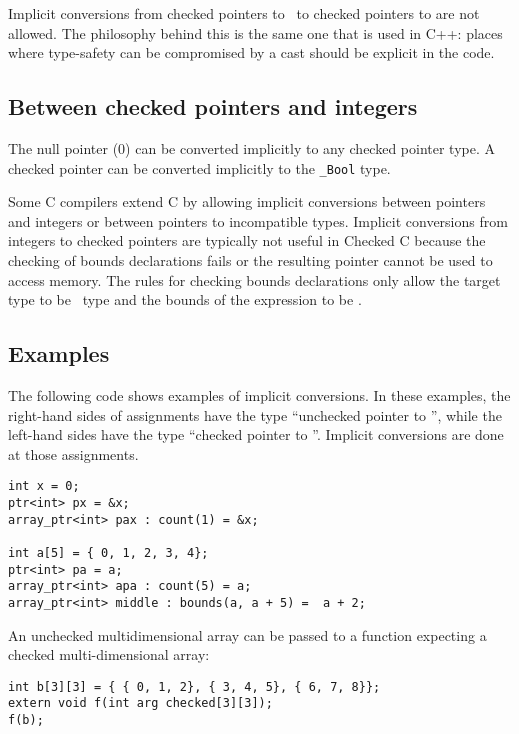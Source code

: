 Implicit conversions from checked pointers to \void\ to checked pointers to  are not allowed.
The philosophy behind this is the same one that is used in C++: places where type-safety
can be compromised by a cast should be explicit in the code.

\subsection{Between checked pointers and integers}

The null pointer (0) can be converted implicitly to any checked pointer type.
A checked pointer can be converted implicitly to the \texttt{\_Bool} type.

Some C compilers extend C by allowing implicit conversions between pointers
and integers or between pointers to incompatible types.  Implicit conversions
from integers to checked pointers are typically not useful in Checked C because
the checking of bounds declarations fails or the resulting pointer cannot
be used to access memory.   The rules for checking bounds declarations only
allow the target type to be \arrayptr\ type and the bounds of the expression to be
\boundsnone.

\subsection{Examples}

The following code shows examples of implicit conversions.  In these examples,
the right-hand sides of assignments have the type ``unchecked pointer to
'', while the left-hand sides have the type ``checked pointer to
''.  Implicit conversions are done at those assignments.
\begin{verbatim}
int x = 0;
ptr<int> px = &x;
array_ptr<int> pax : count(1) = &x;

int a[5] = { 0, 1, 2, 3, 4};
ptr<int> pa = a;
array_ptr<int> apa : count(5) = a;
array_ptr<int> middle : bounds(a, a + 5) =  a + 2;
\end{verbatim}

An unchecked multidimensional array can be passed to a function expecting
a checked multi-dimensional array:
\begin{verbatim}
int b[3][3] = { { 0, 1, 2}, { 3, 4, 5}, { 6, 7, 8}};
extern void f(int arg checked[3][3]);
f(b);
\end{verbatim}

